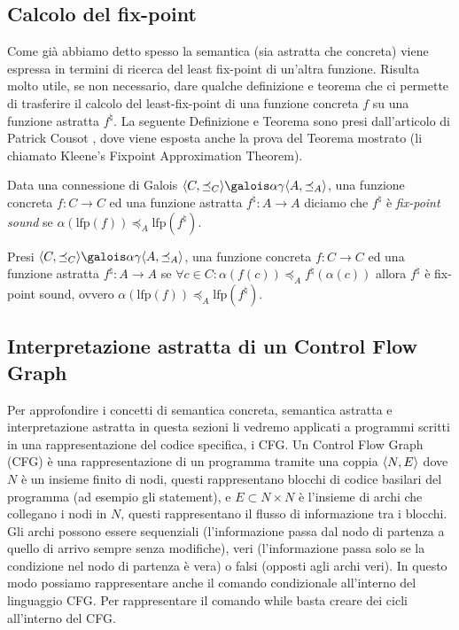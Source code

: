 \subsection{Calcolo del fix-point}
Come già abbiamo detto spesso la semantica (sia astratta che concreta) viene espressa in termini di ricerca del least fix-point di un'altra funzione. Risulta molto utile, se non necessario, dare qualche definizione e teorema che ci permette di trasferire il calcolo del least-fix-point di una funzione concreta \(f\) su una funzione astratta \(f^{\natural}\). La seguente Definizione e Teorema sono presi dall'articolo di Patrick Cousot \cite{DBLP:journals/tcs/Cousot02}, dove viene esposta anche la prova del Teorema mostrato (li chiamato Kleene's Fixpoint Approximation Theorem).

\begin{definition}
Data una connessione di Galois \(\GaloisConnection{C}{A}\), una funzione concreta \(f:C\rightarrow C\) ed una funzione astratta \(f^{\natural}:A\rightarrow A\) diciamo che \(f^{\natural}\) è \textit{fix-point sound} se \(\alpha(\textrm{lfp}(f))\preceq_A \textrm{lfp}(f^{\natural})\).
\end{definition}

\begin{theorem}
Presi \(\GaloisConnection{C}{A}\), una funzione concreta \(f:C\rightarrow C\) ed una funzione astratta \(f^{\natural}:A\rightarrow A\) se \(\forall c\in C: \alpha(f(c))\preceq_A f^{\natural}(\alpha(c))\) allora \(f^{\natural}\) è fix-point sound, ovvero \(\alpha(\textrm{lfp}(f))\preceq_A \textrm{lfp}(f^{\natural})\).
\end{theorem}

\subsection{Interpretazione astratta di un Control Flow Graph}
Per approfondire i concetti di semantica concreta, semantica astratta e interpretazione astratta in questa sezioni li vedremo applicati a programmi scritti in una rappresentazione del codice specifica, i CFG. Un Control Flow Graph (CFG) è una rappresentazione di un programma tramite una coppia \(\langle N, E\rangle\) dove \(N\) è un insieme finito di nodi, questi rappresentano blocchi di codice basilari del programma (ad esempio gli statement), e \(E\subset N\times N\) è l'insieme di archi che collegano i nodi in \(N\), questi rappresentano il flusso di informazione tra i blocchi. Gli archi possono essere sequenziali (l'informazione passa dal nodo di partenza a quello di arrivo sempre senza modifiche), veri (l'informazione passa solo se la condizione nel nodo di partenza è vera) o falsi (opposti agli archi veri). In questo modo possiamo rappresentare anche il comando condizionale all'interno del linguaggio CFG. Per rappresentare il comando while basta creare dei cicli all'interno del CFG.


